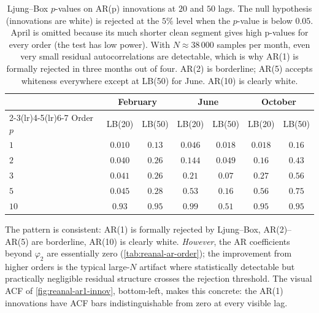 \begin{table}[H]
    \centering
    \footnotesize
    \begin{tabular}{lcccccc}
        \toprule
        & \multicolumn{2}{c}{February} & \multicolumn{2}{c}{June} &
        \multicolumn{2}{c}{October} \\
        \cmidrule(lr){2-3}\cmidrule(lr){4-5}\cmidrule(lr){6-7}
        Order $p$ & LB(20) & LB(50) & LB(20) & LB(50) & LB(20) & LB(50) \\
        \midrule
        $1$  & $0.010$ & $0.13$ & $0.046$ & $0.018$ & $0.018$ & $0.16$ \\
        $2$  & $0.040$ & $0.26$ & $0.144$ & $0.049$ & $0.16$  & $0.43$ \\
        $3$  & $0.041$ & $0.26$ & $0.21$  & $0.07$  & $0.27$  & $0.56$ \\
        $5$  & $0.045$ & $0.28$ & $0.53$  & $0.16$  & $0.56$  & $0.75$ \\
        $10$ & $0.93$  & $0.95$ & $0.99$  & $0.51$  & $0.95$  & $0.95$ \\
        \bottomrule
    \end{tabular}
    \caption{Ljung--Box $p$-values on AR(p) innovations at $20$ and
    $50$ lags. The null hypothesis (innovations are white) is rejected
    at the $5\%$ level when the $p$-value is below $0.05$. April is
    omitted because its much shorter clean segment gives high
    p-values for every order (the test has low power). With $N
    \approx 38\,000$ samples per month, even very small residual
    autocorrelations are detectable, which is why AR(1) is formally
    rejected in three months out of four. AR(2) is borderline; AR(5)
    accepts whiteness everywhere except at LB(50) for June. AR(10)
    is clearly white.}
    \label{tab:reanal-ljungbox}
\end{table}

The pattern is consistent: AR(1) is formally rejected by Ljung--Box,
AR(2)--AR(5) are borderline, AR(10) is clearly white. \emph{However},
the AR coefficients beyond $\varphi_2$ are essentially zero
(\cref{tab:reanal-ar-order}); the improvement from higher orders is
the typical large-$N$ artifact where statistically detectable but
practically negligible residual structure crosses the rejection
threshold. The visual ACF of \cref{fig:reanal-ar1-innov}, bottom-left,
makes this concrete: the AR(1) innovations have ACF bars
indistinguishable from zero at every visible lag.

